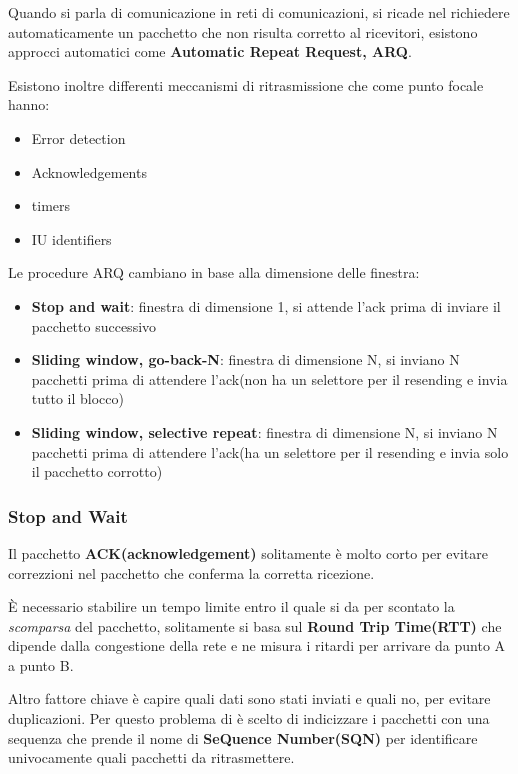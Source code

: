 Quando si parla di comunicazione in reti di comunicazioni, si ricade nel richiedere automaticamente
un pacchetto che non risulta corretto al ricevitori,
esistono approcci automatici come \textbf{Automatic Repeat Request, ARQ}.

Esistono inoltre differenti meccanismi di ritrasmissione che come punto focale hanno:
\begin{itemize}
	\item Error detection
	\item Acknowledgements
	\item timers
	\item IU identifiers
\end{itemize}


Le procedure ARQ cambiano in base alla dimensione delle finestra:
\begin{itemize}
	\item \textbf{Stop and wait}: finestra di dimensione 1, si attende l'ack prima di inviare il pacchetto successivo
	\item \textbf{Sliding window, go-back-N}: finestra di dimensione N, si inviano N pacchetti prima di attendere l'ack(non ha un selettore per il resending e invia tutto il blocco)
	\item \textbf{Sliding window, selective repeat}: finestra di dimensione N, si inviano N pacchetti prima di attendere l'ack(ha un selettore per il resending e invia solo il pacchetto corrotto)
\end{itemize}


\subsubsection{Stop and Wait}

Il pacchetto \textbf{ACK(acknowledgement)} solitamente è molto corto per evitare
correzzioni nel pacchetto che conferma la corretta ricezione.

È necessario stabilire un tempo limite entro il quale si da per scontato
la \textit{scomparsa} del pacchetto, solitamente si basa sul \textbf{Round Trip Time(RTT)} che
dipende dalla congestione  della rete e ne misura i ritardi per arrivare da punto A a punto B.

Altro fattore chiave è capire quali dati sono stati inviati e quali no, per evitare
duplicazioni.
Per questo problema di è scelto di indicizzare i pacchetti con una sequenza che prende
il nome di \textbf{SeQuence Number(SQN)} per identificare univocamente quali pacchetti da ritrasmettere.

